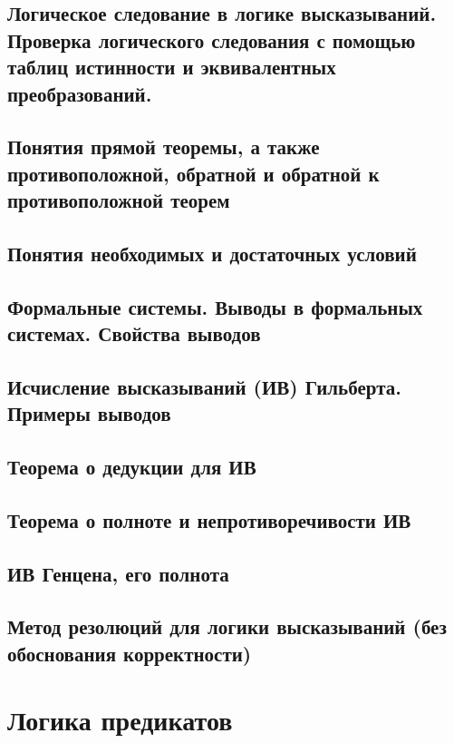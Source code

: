\documentclass[a4paper]{article}
\theoremstyle{definition}
\theoremstyle{remark}
\begin{document}
    \subsection{Логическое следование в логике высказываний. Проверка логического следования с помощью таблиц истинности и  эквивалентных преобразований.}
    \subsection{Понятия прямой теоремы, а также противоположной, обратной и обратной к противоположной теорем}
    \subsection{Понятия необходимых и достаточных условий}
    \subsection{Формальные системы. Выводы в формальных системах. Свойства выводов}
    \subsection{Исчисление высказываний (ИВ) Гильберта. Примеры выводов}
    \subsection{Теорема о дедукции для ИВ}
    \subsection{Теорема о полноте и непротиворечивости ИВ}
    \subsection{ИВ Генцена, его полнота}
    \subsection{Метод резолюций для логики высказываний (без обоснования корректности)}
    \section{Логика предикатов}
\end{document}
